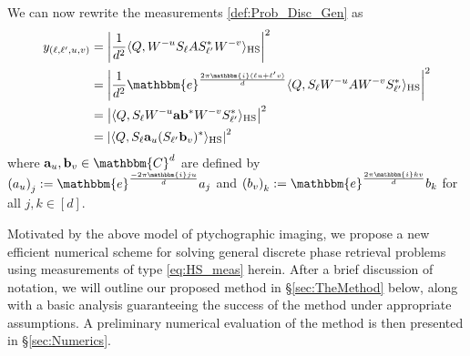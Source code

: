 \documentclass[]{spie}  %
\def \a {\mathbf a}
\def \b {\mathbf b}
\def \HS {\rm HS}
\def \e { \mathbbm{e}}
\def \i { \mathbbm{i}}
\begin{document}
We can now rewrite the measurements \eqref{def:Prob_Disc_Gen} as%
\begin{align}
y_{(\ell, \ell', u, v)} &=  \left| \frac{1}{d^2} \langle Q, W^{-u} S_\ell A S_{\ell'}^* W^{-v} \rangle_{\HS}\right|^2 \\ &= \left| \frac{1}{d^2} \e^{\frac{2 \pi \i( \ell u + \ell' v)}{d}} \langle Q, S_\ell W^{-u} A W^{-v} S_{\ell'}^* \rangle_{\HS}\right|^2 \nonumber \\
  &= \left|\langle Q, S_\ell W^{-u} \a \b^* W^{-v} S_{\ell'}^* \rangle_{\HS}\right|^2 \nonumber \\
  &= \left|\langle Q, S_\ell \a_u (S_{\ell'} \b_v)^* \rangle_{\HS}\right|^2
  \label{eq:HS_meas}
\end{align}%
where $\a_u, \b_v \in \mathbbm{C}^d$ are defined by $\left( a_u \right)_j := \e^{\frac{-2 \pi \i j u}{d}} a_j$ and $\left( b_v \right)_k := \e^{\frac{2 \pi \i k v}{d}} b_k$ for all $j,k \in [d]$.%

Motivated by the above model of ptychographic imaging, we propose a new efficient numerical scheme for solving general discrete phase retrieval problems using measurements of type \eqref{eq:HS_meas} herein.  After a brief discussion of notation, we will outline our proposed method in \S\ref{sec:TheMethod} below, along with a basic analysis guaranteeing the success of the method under appropriate assumptions.  A preliminary numerical evaluation of the method is then presented in \S\ref{sec:Numerics}.
\end{document}
